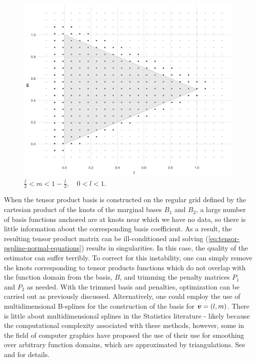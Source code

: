 \begin{figure}[H] \label{fig:triangle-domain}
    \graphicspath{{img/}}
 \includegraphics[scale=0.2]{knot-removal-on-triangle-domain.png}
 \caption{$\frac{l}{2} < m < 1 - \frac{l}{2}, \quad 0 < l < 1.$}
 \end{figure}


When the tensor product basis is constructed on the regular grid defined by the cartesian product of the knots of the marginal bases $B_1$ and $B_2$, a large number of basis functions anchored are at knots near which we have no data, so there is little information about the corresponding basis coefficient. As a result, the resulting tensor product matrix can be ill-conditioned and solving (\ref{eq:tensor-pspline-normal-equations}) results in singularities. In this case, the quality of the estimator can suffer terribly. To correct for this instability, one can simply remove the knots corresponding to tensor products functions which do not overlap with the function domain from the basis, $B$, and trimming the penalty matrices $P_1$ and $P_2$ as needed. With the trimmed basis and penalties, optimization can be carried out as previously discussed. Alternatively, one could employ the use of multidimensional B-splines for the construction of the basis for $\mbox{\boldmath $v$} = \left(l,m\right)$. There is little about multidimensional splines in the Statistics literature - likely because the computational complexity associated with these methods, however, some in the field of computer graphics have proposed the use of their use for smoothing over arbitrary function domains, which are approximated by triangulations. See \citet{dahmen1992blossoming} and \citet{seidel1991symmetric} for details. 

